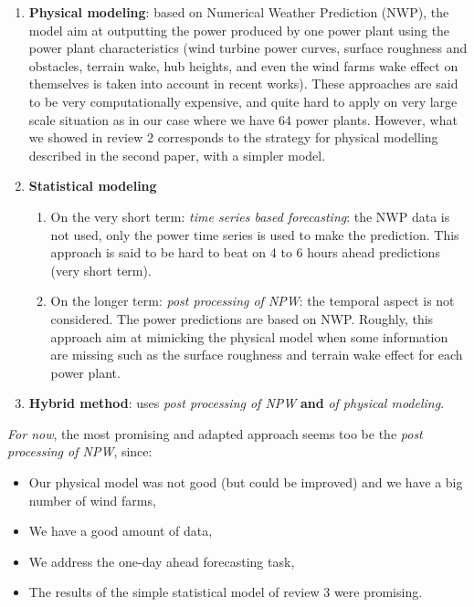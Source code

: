 \documentclass[a4paper, 12pt]{article}
\begin{document}
    \begin{enumerate}[label=\arabic*]
        \item \textbf{Physical modeling}: based on Numerical Weather Prediction (NWP), the model aim at outputting the power produced by one power plant using the power plant characteristics (wind turbine power curves, surface roughness and obstacles, terrain wake, hub heights, and even the wind farms wake effect on themselves is taken into account in recent works). These approaches are said to be very computationally expensive, and quite hard to apply on very large scale situation as in our case where we have 64 power plants. However, what we showed in review 2 corresponds to the strategy for physical modelling described in the second paper, with a simpler model.
        \item \textbf{Statistical modeling}
    
        \begin{enumerate}[label=\alph*]
            \item On the very short term: \emph{time series based forecasting}: the NWP data is not used, only the power time series is used to make the prediction. This approach is said to be hard to beat on 4 to 6 hours ahead predictions (very short term).
            \item On the longer term: \emph{post processing of NPW}: the temporal aspect is not considered. The power predictions are based on NWP. Roughly, this approach aim at mimicking the physical model when some information are missing such as the surface roughness and terrain wake effect for each power plant. 
        \end{enumerate}
        \item \textbf{Hybrid method}: uses \emph{post processing of NPW} \textbf{and} \emph{of physical modeling}.
    \end{enumerate}
    
    \emph{For now}, the most promising and adapted approach seems too be the
    \emph{post processing of NPW}, since:
    \begin{itemize}
        \item Our physical model was not good (but could be improved) and we have a big number of wind farms,
        \item We have a good amount of data,
        \item We address the one-day ahead forecasting task,
        \item The results of the simple statistical model of review 3 were promising.
    \end{itemize}
    
\end{document}
